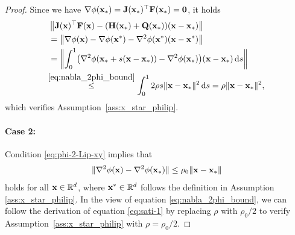 \documentclass[11pt]{article}
\theoremstyle{plain}
\theoremstyle{definition}
\theoremstyle{remark}
\theoremstyle{plain}
\newcommand{\Norm}[1]{\left\| #1 \right\|}
\def\vx{{\bf{x}}}
\def\BR{{\mathbb{R}}}
\def\mH {{\bf H}}
\def\mQ {{\bf Q}}
\def\vx {{{\bf x}}}
\def\BR{{\mathbb{R}}}
\def\F{{\bf F}}
\def \J{{\bf J}}
\def\x{{\bf x}}
\def\0{{\bf 0}}
\begin{document}
\begin{proof}
Since we have $\nabla\phi(\x_*)=\J(\x_*)^{\top}\F(\x_*)=\0$, it holds
\begin{align}
\label{eq:sati-1}
\begin{split}
&\Norm{\J(\x)^{\top}\F(\x)-(\mH(\x_*)+\mQ(\x_*))(\x-\x_*)} \\
&= \Norm{\nabla\phi(\vx)-\nabla\phi(\vx^*)-\nabla^2\phi(\x^*)(\x-\x^*)}\\
&=\Norm{\int_{0}^{1}
\bigl(\nabla^2\phi(\x_*+s(\x-\x_*))-\nabla^2\phi(\x_*)\bigr)
(\x-\x_*)\,{\rm d}s}\\
&\!\!\overset{\eqref{eq:nabla_2phi_bound}}{\leq}\int_0^1 2\rho s\|\x-\x_*\|^2\,{\rm d}s
=\rho\|\x-\x_*\|^2,
\end{split}
\end{align}
which verifies Assumption~\ref{ass:x_star_philip}.

\paragraph{Case 2:} Condition \eqref{eq:phi-2-Lip-xy} implies that 
\begin{align*}
\|\nabla^2\phi(\x)-\nabla^2\phi(\x_*)\|
\leq\rho_0\|\x-\x_*\|    
\end{align*}
holds for all $\vx\in\BR^d$, where $\vx^*\in\BR^d$ follows the definition in Assumption \ref{ass:x_star_philip}.
In the view of equation \eqref{eq:nabla_2phi_bound}, we can follow the derivation of equation \eqref{eq:sati-1} by replacing $\rho$ with $\rho_0/2$ to verify 
Assumption~\ref{ass:x_star_philip} with $\rho=\rho_0/2$.


\end{proof}
\end{document}
